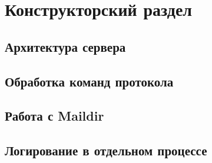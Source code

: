 \documentclass[a4paper,12pt]{report}
\begin{document}
\chapter{Конструкторский раздел}

\section{Архитектура сервера}



\section{Обработка команд протокола}





\section{Работа с Maildir}

\section{Логирование в отдельном процессе}
\end{document}
